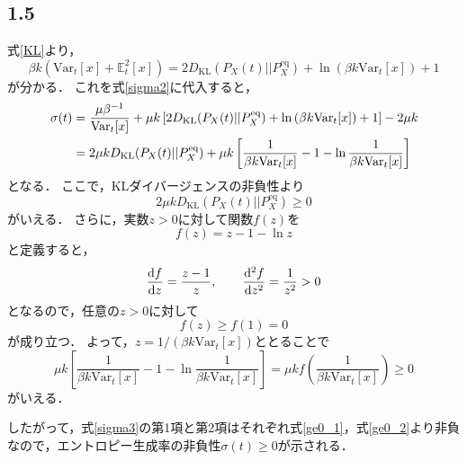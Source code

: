 \documentclass[a4paper,11pt]{jsarticle}
\begin{document}
\subsection*{1.5}

式\eqref{KL}より，
\begin{equation}
  \beta k \left(\mathrm{Var}_t[x] + \mathbb{E}_t^2[x]\right) = 2 D_{\mathrm{KL}}(P_X(t)||P_X^{\mathrm{eq}}) + \ln{\left(\beta k \mathrm{Var}_t[x]\right)} + 1
\end{equation}
が分かる．
これを式\eqref{sigma2}に代入すると，
\begin{align}
  \sigma(t) &= \frac{\mu\beta^{-1}}{\mathrm{Var}_t[x]} + \mu k \left[2 D_{\mathrm{KL}}(P_X(t)||P_X^{\mathrm{eq}}) + \ln{\left(\beta k \mathrm{Var}_t[x]\right)} + 1\right] - 2\mu k \notag\\
  &= 2\mu k D_{\mathrm{KL}}(P_X(t)||P_X^{\mathrm{eq}}) + \mu k \left[\frac{1}{\beta k \mathrm{Var}_t[x]}- 1 -\ln{\frac{1}{\beta k \mathrm{Var}_t[x]}}\right] \label{sigma3}
\end{align}
となる．
ここで，KLダイバージェンスの非負性より
\begin{equation}
  2\mu k D_{\mathrm{KL}}(P_X(t)||P_X^{\mathrm{eq}}) \ge 0 \label{ge0_1}
\end{equation}
がいえる．
さらに，実数$z>0$に対して関数$f(z)$を
\begin{equation}
  f(z) = z - 1 - \ln{z}
\end{equation}
と定義すると，
\begin{equation}
  \dv{f}{z} = \frac{z-1}{z},\qquad \dv[2]{f}{z} = \frac{1}{z^2} >0
\end{equation}
となるので，任意の$z>0$に対して
\begin{equation}
  f(z) \ge f(1) = 0
\end{equation}
が成り立つ．
よって，$z=1/(\beta k \mathrm{Var}_t[x])$ととることで
\begin{equation}
  \mu k \left[\frac{1}{\beta k \mathrm{Var}_t[x]}- 1 -\ln{\frac{1}{\beta k \mathrm{Var}_t[x]}}\right] = \mu kf\left(\frac{1}{\beta k \mathrm{Var}_t[x]}\right) \ge 0 \label{ge0_2}
\end{equation}
がいえる．

したがって，式\eqref{sigma3}の第1項と第2項はそれぞれ式\eqref{ge0_1}，式\eqref{ge0_2}より非負なので，エントロピー生成率の非負性$\sigma(t)\ge 0$が示される．
\end{document}

